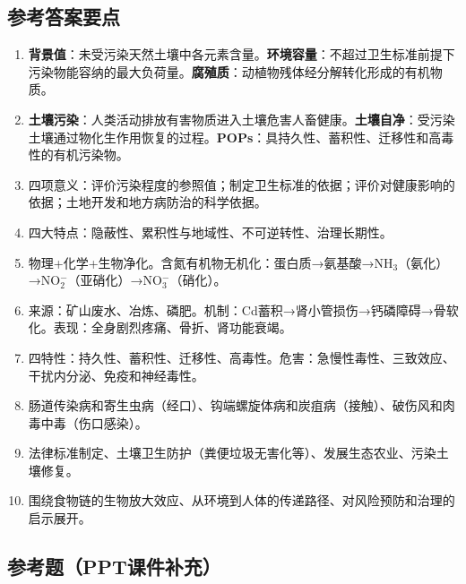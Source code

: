 \subsection*{参考答案要点}

\begin{enumerate}[leftmargin=*, itemsep=5pt]
    \item \textbf{背景值}：未受污染天然土壤中各元素含量。\textbf{环境容量}：不超过卫生标准前提下污染物能容纳的最大负荷量。\textbf{腐殖质}：动植物残体经分解转化形成的有机物质。

    \item \textbf{土壤污染}：人类活动排放有害物质进入土壤危害人畜健康。\textbf{土壤自净}：受污染土壤通过物化生作用恢复的过程。\textbf{POPs}：具持久性、蓄积性、迁移性和高毒性的有机污染物。

    \item 四项意义：评价污染程度的参照值；制定卫生标准的依据；评价对健康影响的依据；土地开发和地方病防治的科学依据。

    \item 四大特点：隐蔽性、累积性与地域性、不可逆转性、治理长期性。

    \item 物理+化学+生物净化。含氮有机物无机化：蛋白质→氨基酸→NH$_3$（氨化）→NO$_2^-$（亚硝化）→NO$_3^-$（硝化）。

    \item 来源：矿山废水、冶炼、磷肥。机制：Cd蓄积→肾小管损伤→钙磷障碍→骨软化。表现：全身剧烈疼痛、骨折、肾功能衰竭。

    \item 四特性：持久性、蓄积性、迁移性、高毒性。危害：急慢性毒性、三致效应、干扰内分泌、免疫和神经毒性。

    \item 肠道传染病和寄生虫病（经口）、钩端螺旋体病和炭疽病（接触）、破伤风和肉毒中毒（伤口感染）。

    \item 法律标准制定、土壤卫生防护（粪便垃圾无害化等）、发展生态农业、污染土壤修复。

    \item 围绕食物链的生物放大效应、从环境到人体的传递路径、对风险预防和治理的启示展开。
\end{enumerate}

\subsection*{参考题（PPT课件补充）}

